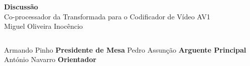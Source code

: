 \documentclass{beamer}
\begin{document}
\begin{frame}[plain,c]
       \begin{center}
              \Huge \textbf{Discussão}\\ \vspace{1cm}
              \Large Co-processador da Transformada para o Codificador de Vídeo AV1 \\ \vspace{.5cm}
              \large Miguel Oliveira Inocêncio      \\ \vspace{1.5cm}
              \begin{columns}
                            \centering
                            \large Armando Pinho
                            \small \textbf{Presidente de Mesa}
                            \centering
                            \large Pedro Assunção
                            \small \textbf{Arguente Principal}
                            \centering
                            \large António Navarro
                            \small \textbf{Orientador}
              \end{columns}
       \end{center}
\end{frame}
\end{document}
